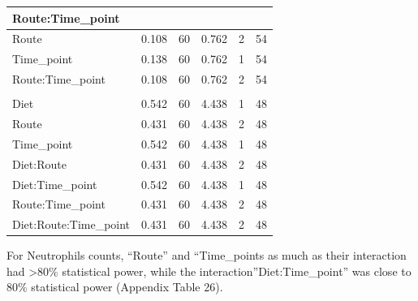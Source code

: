 \documentclass[
  12pt,
  letterpaper,
]{article}
\begin{document}
\begin{longtable}{l|rrrrr}
\multicolumn{6}{l}{Route:Time\_point} \\[2.5pt] 
\midrule\addlinespace[2.5pt]
Route & 0.108 & 60 & 0.762 & 2 & 54 \\ 
Time\_point & 0.138 & 60 & 0.762 & 1 & 54 \\ 
Route:Time\_point & 0.108 & 60 & 0.762 & 2 & 54 \\ 
\midrule\addlinespace[2.5pt]
\multicolumn{6}{l}{Diet:Route:Time\_point} \\[2.5pt] 
\midrule\addlinespace[2.5pt]
Diet & 0.542 & 60 & 4.438 & 1 & 48 \\ 
Route & 0.431 & 60 & 4.438 & 2 & 48 \\ 
Time\_point & 0.542 & 60 & 4.438 & 1 & 48 \\ 
Diet:Route & 0.431 & 60 & 4.438 & 2 & 48 \\ 
Diet:Time\_point & 0.542 & 60 & 4.438 & 1 & 48 \\ 
Route:Time\_point & 0.431 & 60 & 4.438 & 2 & 48 \\ 
Diet:Route:Time\_point & 0.431 & 60 & 4.438 & 2 & 48 \\ 
\bottomrule
\end{longtable}
\endgroup

For Neutrophils counts, ``Route'' and ``Time\_points as much as their interaction had \textgreater80\% statistical power, while the interaction''Diet:Time\_point'' was close to 80\% statistical power (Appendix Table 26).
\end{document}
